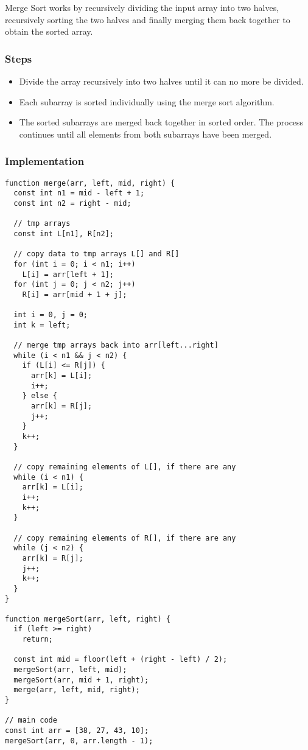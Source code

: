 Merge Sort works by recursively dividing the input array into two halves, recursively  sorting the two halves and finally merging them back together to obtain the sorted array.

\subsubsection*{Steps}

\begin{itemize}
  \item Divide the array recursively into two halves until it can no more be divided.
  \item Each subarray is sorted individually using the merge sort algorithm.
  \item The sorted subarrays are merged back together in sorted order. The process continues until all elements from both subarrays have been merged.
\end{itemize}

\subsubsection*{Implementation}

\begin{lstlisting}[style=general]
function merge(arr, left, mid, right) {
  const int n1 = mid - left + 1;
  const int n2 = right - mid;

  // tmp arrays
  const int L[n1], R[n2];

  // copy data to tmp arrays L[] and R[]
  for (int i = 0; i < n1; i++)
    L[i] = arr[left + 1];
  for (int j = 0; j < n2; j++)
    R[i] = arr[mid + 1 + j];

  int i = 0, j = 0;
  int k = left;

  // merge tmp arrays back into arr[left...right]
  while (i < n1 && j < n2) {
    if (L[i] <= R[j]) {
      arr[k] = L[i];
      i++;
    } else {
      arr[k] = R[j];
      j++;
    }
    k++;
  }

  // copy remaining elements of L[], if there are any
  while (i < n1) {
    arr[k] = L[i];
    i++;
    k++;
  }

  // copy remaining elements of R[], if there are any
  while (j < n2) {
    arr[k] = R[j];
    j++;
    k++;
  }
}

function mergeSort(arr, left, right) {
  if (left >= right)
    return;

  const int mid = floor(left + (right - left) / 2);
  mergeSort(arr, left, mid);
  mergeSort(arr, mid + 1, right);
  merge(arr, left, mid, right);
}

// main code
const int arr = [38, 27, 43, 10];
mergeSort(arr, 0, arr.length - 1);
\end{lstlisting}


